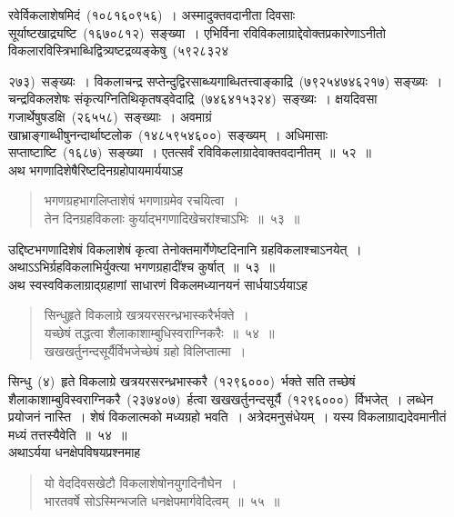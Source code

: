 \documentclass[11pt, openany]{book}
\begin{document}
\indent
रवेर्विकलाशेषमिदं~(१०८१६०९५६)~। अस्मादुक्तवदानीता दिवसाः सूर्याष्टखाद्र्यष्टि~(१६७०८१२)~सङ्ख्या~। एभिर्विना रविविकलाग्राद्देवोक्तप्रकारेणाऽनीतो विकलारविस्त्रिभाब्धिद्वित्र्यष्टद्रव्यङ्केषु~(५९२८३२४\textendash

\newpage
\thispagestyle{fancy}
\fancyhf{}

\noindent
२७३)~सङ्ख्यः~। विकलाचन्द्र सप्तेन्दुद्विरसाब्ध्यगाब्धितत्त्वाङ्काद्रि~(७९२५४७४६२१७)
सङ्ख्यः~। चन्द्रविकलशेषः संकृत्यग्नितिथिकृतषड्वेदाद्रि~(७४६४१५३२४)~सङ्ख्यः~। क्षयदिवसा गजार्थेषुषडक्षि~(२६५५८)~सङ्ख्याः~। अवमाग्रं खाभ्राङ्गाब्धीषुनन्दार्थाष्टलोक~(१४८५९५४६००)~सङ्ख्यम्~। अधिमासाः सप्ताष्टाष्टि~(१६८७)~सङ्ख्या~। एतत्सर्वं रविविकलाग्रादेवाक्तवदानीतम्~॥~५२~॥\\

\indent
अथ भगणादिशेषैरिष्टदिनग्रहोपायमार्ययाऽह \textendash

\begin{quote}
{\ks भगणग्रहभागलिप्ताशेषं भगणाग्रमेव रचयित्वा~।\\
तेन दिनग्रहविकलाः कुर्याद्भगणादिखेचरांश्चाऽभिः~॥~५३~॥}
\end{quote}

\indent
उद्दिष्टभगणादिशेषं विकलाशेषं कृत्वा तेनोक्तमार्गेणेष्टदिनानि ग्रहविकलाश्चाऽनयेत्~। अथाऽऽभिर्ग्रहविकलाभिर्युक्त्या भगणग्रहादींश्च कुर्षात्~॥~५३~॥\\

\indent
अथ स्वस्वविकलाग्राद्ग्रहाणां साधारणं विकलमध्यानयनं सार्धयाऽर्ययाऽह\textendash

\begin{quote}
{\ks सिन्धुहृते विकलाग्रे खत्रयरसरन्ध्रभास्करैर्भक्ते~।\\
यच्छेषं तद्धत्वा शैलाकाशाम्बुधिस्वराग्निकरैः~॥~५४~॥\\
खखखर्तुनन्दसूर्यैर्विभजेच्छेषं ग्रहो विलिप्तात्मा~।}
\end{quote}

\indent
सिन्धु~(४)~हृते विकलाग्रे खत्रयरसरन्ध्रभास्करै~(१२९६०००)~र्भक्ते सति तच्छेषं शैलाकाशाम्बुविस्वराग्निकरै~(२३७४०७)~र्हत्वा खखखर्तुनन्दसूर्यै~(१२९६०००)~र्विभजेत्~। लब्धेन प्रयोजनं नास्ति~। शेषं विकलात्मको मध्यग्रहो भवति~। अत्रेदमनुसंधेयम्~। यस्य विकलाग्राद्यदेवमानीतं मध्यं तत्तस्यैवेति~॥~५४~॥\\

\indent
अथाऽर्यया धनक्षेपविषयप्रश्नमाह\textendash

\begin{quote}
{\ks यो वेददिवसखेटौ विकलाशेषोनयुगदिनौघेन~।\\
भारतवर्षे सोऽस्मिन्भजति धनक्षेपमार्गवेदित्वम्~॥~५५~॥}
\end{quote}
\end{document}

